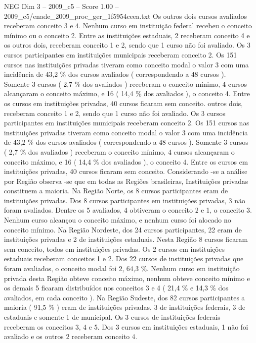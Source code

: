 \begin{textsample}{NEG Dim 3 – 2009\_c5 – Score 1.00 – 2009\_c5/enade\_2009\_proc\_ger\_1f5954ceea.txt}
Os outros dois cursos avaliados receberam conceito 3 e 4.
Nenhum curso em instituição federal recebeu o conceito mínimo ou o conceito 2.
Entre as instituições estaduais, 2 receberam conceito 4 e os outros dois, receberam conceito 1 e 2, sendo que 1 curso não foi avaliado.
Os 3 cursos participantes em instituições municipais receberam conceito 2.
Os 151 cursos nas instituições privadas tiveram como conceito modal o valor 3 com uma incidência de 43,2 \% dos cursos avaliados ( correspondendo a 48 cursos ).
Somente 3 cursos ( 2,7 \% dos avaliados ) receberam o conceito mínimo, 4 cursos alcançaram o conceito máximo, e 16 ( 14,4 \% dos avaliados ), o conceito 4.
Entre os cursos em instituições privadas, 40 cursos ficaram sem conceito. outros dois, receberam conceito 1 e 2, sendo que 1 curso não foi avaliado.
Os 3 cursos participantes em instituições municipais receberam conceito 2.
Os 151 cursos nas instituições privadas tiveram como conceito modal o valor 3 com uma incidência de 43,2 \% dos cursos avaliados ( correspondendo a 48 cursos ).
Somente 3 cursos ( 2,7 \% dos avaliados ) receberam o conceito mínimo, 4 cursos alcançaram o conceito máximo, e 16 ( 14,4 \% dos avaliados ), o conceito 4.
Entre os cursos em instituições privadas, 40 cursos ficaram sem conceito.
Considerando -se a análise por Região observa -se que em todas as Regiões brasileiras, Instituições privadas constituem a maioria.
Na Região Norte, os 8 cursos participantes eram de instituições privadas.
Dos 8 cursos participantes em instituições privadas, 3 não foram avaliados.
Dentre os 5 avaliados, 4 obtiveram o conceito 2 e 1, o conceito 3.
Nenhum curso alcançou o conceito máximo, e nenhum curso foi alocado no conceito mínimo.
Na Região Nordeste, dos 24 cursos participantes, 22 eram de instituições privadas e 2 de instituições estaduais.
Nesta Região 8 cursos ficaram sem conceito, todos em instituições privadas.
Os 2 cursos em instituições estaduais receberam conceitos 1 e 2.
Dos 22 cursos de instituições privadas que foram avaliados, o conceito modal foi 2, 64,3 \%.
Nenhum curso em instituição privada desta Região obteve conceito máximo, nenhum obteve conceito mínimo e os demais 5 ficaram distribuídos nos conceitos 3 e 4 ( 21,4 \% e 14,3 \% dos avaliados, em cada conceito ).
Na Região Sudeste, dos 82 cursos participantes a maioria ( 91,5 \% ) eram de instituições privadas, 3 de instituições federais, 3 de estaduais e somente 1 de municipal.
Os 3 cursos de instituições federais receberam os conceitos 3, 4 e 5.
Dos 3 cursos em instituições estaduais, 1 não foi avaliado e os outros 2 receberam conceito 4.

\end{textsample}
